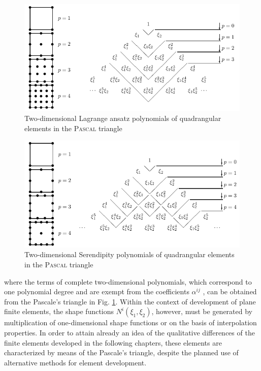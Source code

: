 \begin{figure}
    \centering
    \includegraphics[scale=0.5]{Figures/Chapter2/LagrangePascal.png}
    \caption{Two-dimensional Lagrange ansatz polynomials of quadrangular elements in the
 \textsc{Pascal} triangle  }
    \label{fig:3.5}
\end{figure}


\begin{figure}
    \centering
    \includegraphics[scale=0.5]{Figures/Chapter2/polynomialsPascal.png}
    \caption{Two-dimensional Serendipity polynomials of quadrangular elements in the \textsc{Pascal}
triangle }
    \label{fig:3.6}
\end{figure}

where the terms of complete two-dimensional polynomials, which correspond to one polynomial
degree and are exempt from the coefficients $\alpha^{ij}$ , can be obtained from the Pascale’s triangle
in Fig. \ref{fig:3.5}. Within the context of development of plane finite elements, the shape functions $N^i (\xi_1 , \xi_2 )$, however, must be generated by multiplication of one-dimensional shape functions or on the basis of interpolation properties. In order to attain
already an idea of the qualitative differences of the finite elements developed in the following
chapters, these elements are characterized by means of the Pascale’s triangle, despite the
planned use of alternative methods for element development.

